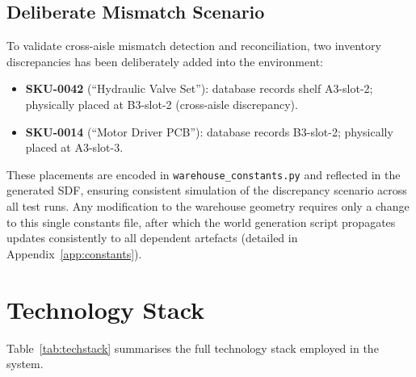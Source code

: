 \documentclass[12pt,a4paper]{report}
\begin{document}
\subsection{Deliberate Mismatch Scenario}

To validate cross-aisle mismatch detection and reconciliation, two inventory discrepancies has been deliberately added into the environment:

\begin{itemize}
    \item \textbf{SKU-0042} (``Hydraulic Valve Set''): database records shelf A3-slot-2; physically placed at B3-slot-2 (cross-aisle discrepancy).
    \item \textbf{SKU-0014} (``Motor Driver PCB''): database records B3-slot-2; physically placed at A3-slot-3.
\end{itemize}

These placements are encoded in \texttt{warehouse\_constants.py} and reflected in the generated SDF, ensuring consistent simulation of the discrepancy scenario across all test runs. Any modification to the warehouse geometry requires only a change to this single constants file, after which the world generation script propagates updates consistently to all dependent artefacts (detailed in Appendix~\ref{app:constants}).

\section{Technology Stack}

Table~\ref{tab:techstack} summarises the full technology stack employed in the system.
\end{document}
